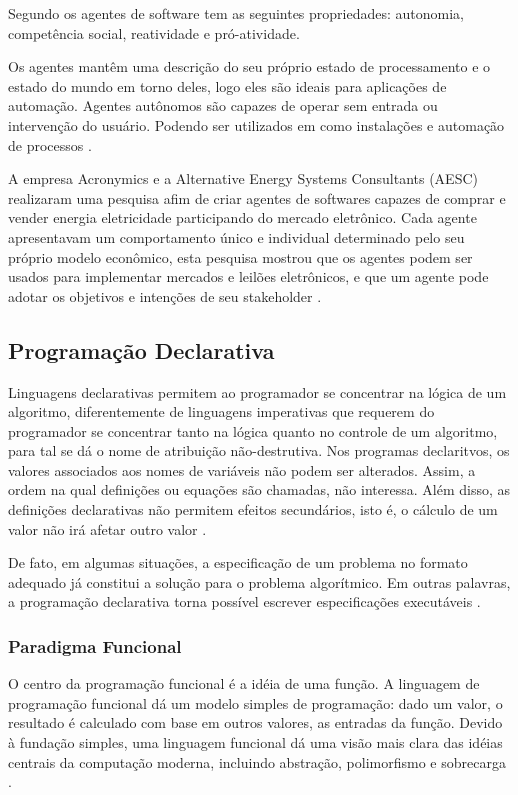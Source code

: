 Segundo  os agentes de software tem as seguintes propriedades: autonomia, competência social, reatividade e  pró-atividade.

Os agentes mantêm uma descrição do seu próprio estado de processamento e o estado do mundo em torno deles, logo eles são ideais para aplicações de automação. Agentes autônomos são capazes de operar sem entrada ou intervenção do usuário. Podendo ser utilizados em como instalações e automação de processos \cite{agentBuilderWhy}.

A empresa Acronymics e a Alternative Energy Systems Consultants (AESC) realizaram uma pesquisa afim de criar agentes de softwares capazes de comprar e vender energia eletricidade participando do mercado eletrônico. Cada agente apresentavam um comportamento único e individual determinado pelo seu próprio modelo econômico, esta pesquisa mostrou que os agentes podem ser usados para implementar mercados e leilões eletrônicos, e que um agente pode adotar os objetivos e intenções de seu stakeholder \cite{agentBuilder}.

\subsection{Programação Declarativa}

Linguagens declarativas permitem ao programador se concentrar na lógica de um algoritmo, diferentemente de linguagens imperativas que requerem do programador se concentrar tanto na lógica quanto no controle de um algoritmo, para tal se dá o nome de atribuição não-destrutiva. Nos programas declaritvos, os valores associados aos nomes de variáveis não podem ser alterados. Assim, a ordem na qual definições ou equações são chamadas, não interessa. Além disso, as definições declarativas não permitem efeitos secundários, isto é, o cálculo de um  valor não irá afetar outro valor \cite{coenen}.

De fato, em algumas situações, a especificação de um problema no formato adequado já constitui a solução para o problema algorítmico. Em outras palavras, a programação declarativa torna possível escrever especificações executáveis \cite[pág.~2]{apt1996}.

\subsubsection{Paradigma Funcional}
O centro da programação funcional é a idéia de uma função. A linguagem de programação funcional dá um modelo simples de programação: dado um valor, o resultado é calculado com base em outros valores, as entradas da função. Devido à fundação simples, uma linguagem funcional dá uma visão mais clara das idéias centrais da computação moderna, incluindo abstração, polimorfismo e sobrecarga \cite[pág.~16]{thompson1999}.


